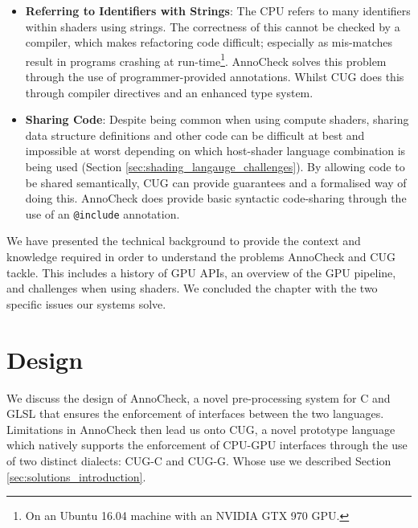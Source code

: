 \documentclass[a4paper,12pt,twoside,openright]{report}
\begin{document}
\begin{itemize}

    \item \textbf{Referring to Identifiers with Strings}: The CPU refers to
    many identifiers within shaders using strings. The correctness of this
    cannot be checked by a compiler, which makes refactoring code difficult;
    especially as mis-matches result in programs crashing at
    run-time\footnote{On an Ubuntu 16.04 machine with an NVIDIA GTX 970 GPU.}.
    AnnoCheck solves this problem through the use of programmer-provided
    annotations. Whilst CUG does this through compiler directives and an
    enhanced type system.

    \item \textbf{Sharing Code}: Despite being common when using compute
    shaders, sharing data structure definitions and other code can be difficult
    at best and impossible at worst depending on which host-shader language
    combination is being used (Section \ref{sec:shading_langauge_challenges}).
    By allowing code to be shared semantically, CUG can provide guarantees and
    a formalised way of doing this. AnnoCheck does provide basic syntactic
    code-sharing through the use of an \texttt{@include} annotation.

\end{itemize}

We have presented the technical background to provide the context and knowledge
required in order to understand the problems AnnoCheck and CUG tackle. This
includes a history of GPU APIs, an overview of the GPU pipeline, and challenges
when using shaders. We concluded the chapter with the two specific issues our
systems solve.




\chapter{Design}

We discuss the design of AnnoCheck, a novel pre-processing system for C and
GLSL that ensures the enforcement of interfaces between the two languages.
Limitations in AnnoCheck then lead us onto CUG, a novel prototype language
which natively supports the enforcement of CPU-GPU interfaces through the use
of two distinct dialects: CUG-C and CUG-G. Whose use we described Section
\ref{sec:solutions_introduction}.
\end{document}
